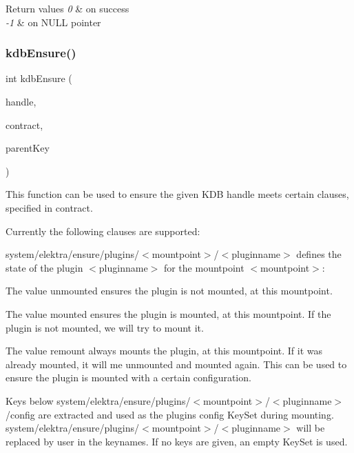 \begin{DoxyRetVals}{Return values}
{\em 0} & on success \\
\hline
{\em -\/1} & on N\+U\+LL pointer \\
\hline
\end{DoxyRetVals}
\mbox{\label{group__kdb_ga0955373877575fa21275891518f8ab31}} 
\subsubsection{\texorpdfstring{kdbEnsure()}{kdbEnsure()}}
{\footnotesize\ttfamily int kdb\+Ensure (\begin{DoxyParamCaption}\item[{K\+DB $\ast$}]{handle,  }\item[{Key\+Set $\ast$}]{contract,  }\item[{Key $\ast$}]{parent\+Key }\end{DoxyParamCaption})}



This function can be used to ensure the given K\+DB {\ttfamily handle} meets certain clauses, specified in {\ttfamily contract}. 

Currently the following clauses are supported\+:


\begin{DoxyItemize}
\item {\ttfamily system/elektra/ensure/plugins/$<$mountpoint$>$/$<$pluginname$>$} defines the state of the plugin {\ttfamily $<$pluginname$>$} for the mountpoint {\ttfamily $<$mountpoint$>$}\+:
\begin{DoxyItemize}
\item The value {\ttfamily unmounted} ensures the plugin is not mounted, at this mountpoint.
\item The value {\ttfamily mounted} ensures the plugin is mounted, at this mountpoint. If the plugin is not mounted, we will try to mount it.
\item The value {\ttfamily remount} always mounts the plugin, at this mountpoint. If it was already mounted, it will me unmounted and mounted again. This can be used to ensure the plugin is mounted with a certain configuration.
\end{DoxyItemize}
\item Keys below {\ttfamily system/elektra/ensure/plugins/$<$mountpoint$>$/$<$pluginname$>$/config} are extracted and used as the plugins config Key\+Set during mounting. {\ttfamily system/elektra/ensure/plugins/$<$mountpoint$>$/$<$pluginname$>$} will be replaced by {\ttfamily user} in the keynames. If no keys are given, an empty Key\+Set is used.
\end{DoxyItemize}

